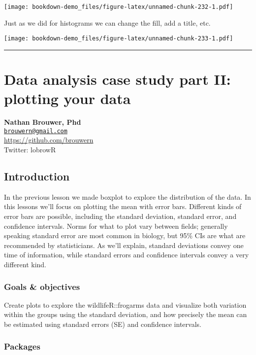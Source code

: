 \documentclass[]{book}
\theoremstyle{definition}
\theoremstyle{definition}
\theoremstyle{definition}
\theoremstyle{remark}
\begin{document}
\texttt{[image: bookdown-demo\_files/figure-latex/unnamed-chunk-232-1.pdf]}

Just as we did for histograms we can change the fill, add a title, etc.

\texttt{[image: bookdown-demo\_files/figure-latex/unnamed-chunk-233-1.pdf]}

\begin{center}\rule{0.5\linewidth}{\linethickness}\end{center}

\chapter{Data analysis case study part II: plotting your
data}\label{data-analysis-case-study-part-ii-plotting-your-data}

\textbf{Nathan Brouwer, Phd}\\
\href{mailto:brouwern@gmail.com}{\nolinkurl{brouwern@gmail.com}}\\
\url{https://github.com/brouwern}\\
Twitter: lobrowR

\section{Introduction}\label{introduction-10}

In the previous lesson we made boxplot to explore the distribution of
the data. In this lessons we'll focus on plotting the mean with error
bars. Different kinds of error bars are possible, including the standard
deviation, standard error, and confidence intervals. Norms for what to
plot vary between fields; generally speaking standard error are most
common in biology, but 95\% CIs are what are recommended by
statisticians. As we'll explain, standard deviations convey one time of
information, while standard errors and confidence intervals convey a
very different kind.

\subsection{Goals \& objectives}\label{goals-objectives-1}

Create plots to explore the wildlifeR::frogarms data and visualize both
variation within the groups using the standard deviation, and how
precisely the mean can be estimated using standard errors (SE) and
confidence intervals.

\subsection{Packages}\label{packages-9}
\end{document}
